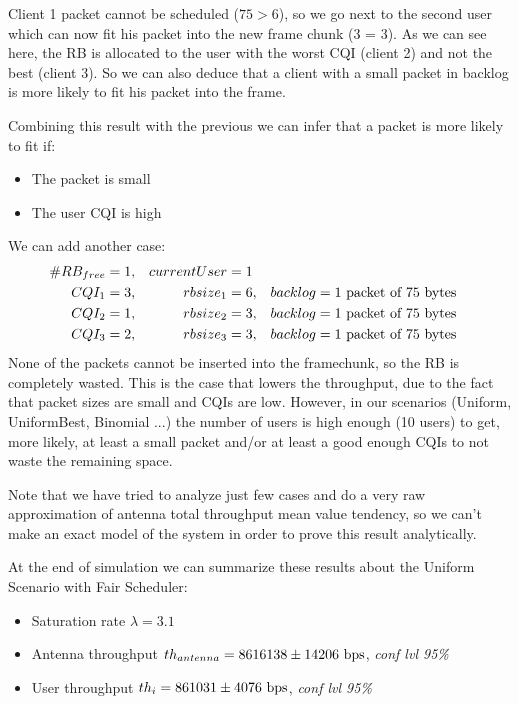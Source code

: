 Client 1 packet cannot be scheduled (\(75 > 6\)), so we go next to the second user which can now fit his packet into the new frame chunk (3 = 3). As we can see here, the RB is allocated to the user with the worst CQI (client 2) and not the best (client 3). So we can also deduce that a client with a small packet in backlog is more likely to fit his packet into the frame.

Combining this result with the previous we can infer that a packet is more likely to fit if:
\begin{itemize}
	\item The packet is small
	\item The user CQI is high
\end{itemize}
We can add another case:
\begin{align}
	\#RB_{free} &= 1, &currentUser &= 1 \nonumber \\
	CQI_1 &= 3, &rbsize_1 &= 6, &backlog &= \textnormal{1 packet of 75 bytes} \nonumber\\
	CQI_2 &= 1, &rbsize_2 &= 3, &backlog &= \textnormal{1 packet of 75 bytes} \nonumber\\
	CQI_3 &= 2, &rbsize_3 &= 3, &backlog &= \textnormal{1 packet of 75 bytes} \nonumber
\end{align}
None of the packets cannot be inserted into the framechunk, so the RB is completely wasted. This is the case that lowers the throughput, due to the fact that packet sizes are small and CQIs are low. However, in our scenarios (Uniform, UniformBest, Binomial ...) the number of users is high enough (10 users) to get, more likely, at least a small packet and/or at least a good enough CQIs to not waste the remaining space.

Note that we have tried to analyze just few cases and do a very raw approximation of antenna total throughput mean value tendency, so we can't make an exact model of the system in order to prove this result analytically.

At the end of simulation we can summarize these results about the Uniform Scenario with Fair Scheduler:
\begin{itemize}
	\item Saturation rate \(\lambda = 3.1\)
	\item Antenna throughput \(th_{antenna} = 8616138 \pm 14206 \textnormal{ bps}\), \textit{conf lvl 95\%}
	\item User throughput \(th_{i} = 861031 \pm 4076 \textnormal{ bps}\), \textit{conf lvl 95\%}
\end{itemize} 

